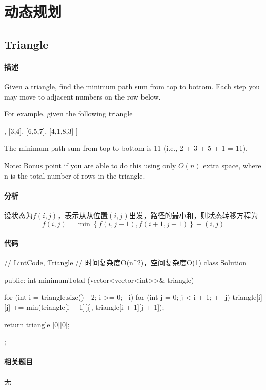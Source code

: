 \chapter{动态规划}


\section{Triangle} %
\label{sec:triangle}


\subsubsection{描述}
Given a triangle, find the minimum path sum from top to bottom. Each step you may move to adjacent numbers on the row below.

For example, given the following triangle
\begin{Code}
[
     [2],
    [3,4],
   [6,5,7],
  [4,1,8,3]
]
\end{Code}
The minimum path sum from top to bottom is 11 (i.e., 2 + 3 + 5 + 1 = 11).

Note: Bonus point if you are able to do this using only $O(n)$ extra space, where n is the total number of rows in the triangle.


\subsubsection{分析}
设状态为$f(i, j)$，表示从从位置$(i,j)$出发，路径的最小和，则状态转移方程为
$$
f(i,j)=\min\left\{f(i,j+1),f(i+1,j+1)\right\}+(i,j)
$$


\subsubsection{代码}
\begin{Code}
// LintCode, Triangle
// 时间复杂度O(n^2)，空间复杂度O(1)
class Solution {
public:
    int minimumTotal (vector<vector<int>>& triangle) {
        for (int i = triangle.size() - 2; i >= 0; --i)
            for (int j = 0; j < i + 1; ++j)
                triangle[i][j] += min(triangle[i + 1][j],
                        triangle[i + 1][j + 1]);

        return triangle [0][0];
    }
};
\end{Code}


\subsubsection{相关题目}
\begindot
\item 无
\myenddot


